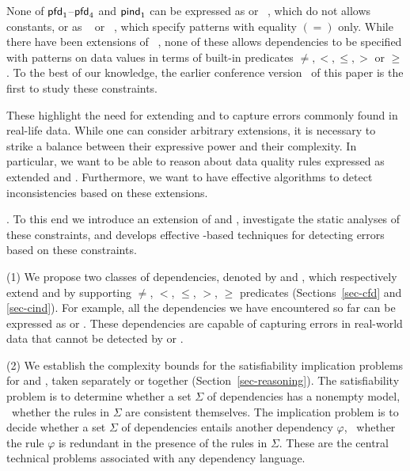 \vspace{-0.5ex}

None of ${\mathsf{pfd}}_1$--${\mathsf{pfd}}_4$ and ${\mathsf{pind}}_1$
can be expressed as
\FDs or \INDs~\cite{AbHuVi1995}, which do not allows constants,
or as \CFDs~\cite{CFDs} or \CINDs~\cite{tcs-CINDs}, which specify
patterns with  equality $(=)$ only. While there have been
extensions of \CFDs~\cite{icde08,divesh08,ChenFM09}, none of these allows
dependencies to be specified with patterns on data values in terms of
built-in predicates $\ne, <, \le, >$ or $\ge$.  To the best of our
knowledge, the earlier conference version~\cite{dexaChenFM09} of this paper is the first to study these constraints.



These highlight the
need for extending \CFDs and \CINDs to capture errors
commonly found in real-life data.
While one can consider arbitrary extensions,
it is necessary to strike a balance between their expressive power and their complexity.
In particular, we want to be able to reason about data quality rules
expressed as extended \CFDs and \CINDs. Furthermore, we want to
have effective algorithms to detect inconsistencies
based on these extensions.


.
To this end we introduce an extension of  \CFDs and \CINDs, investigate the static analyses of these constraints, and develops
effective \SQL-based techniques for detecting errors based on these constraints.

\sstab
\noindent(1) We propose two classes of dependencies, denoted by
\pCFDs and \pCINDs, which respectively extend \CFDs and \CINDs by supporting
$\ne$, $<$, $\le$, $>$, $\ge$ predicates (Sections~\ref{sec-cfd} and \ref{sec-cind}). For example, all
the dependencies we have encountered so far can be expressed as
\pCFDs or \pCINDs. These dependencies are capable of capturing
errors
in real-world data that cannot be detected by \CFDs or \CINDs.

\sstab
\noindent(2) We establish the complexity bounds for  the satisfiability
implication problems for \pCFDs and \pCINDs,
taken separately or together (Section~\ref{sec-reasoning}). The
satisfiability problem is to determine whether a set $\Sigma$ of
dependencies has a nonempty model, \ie~whether the rules in $\Sigma$
are consistent themselves. The implication problem is to decide whether
a set $\Sigma$ of dependencies entails another dependency $\varphi$,
\ie~whether the rule $\varphi$ is redundant in the presence of
the rules in $\Sigma$. These are the central technical problems
associated with any dependency language.

